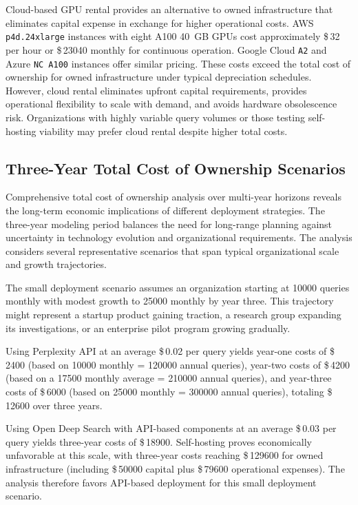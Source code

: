Cloud-based GPU rental provides an alternative to owned infrastructure that eliminates capital expense in exchange for higher operational costs. AWS \texttt{p4d.24xlarge} instances with eight A100 40~GB GPUs cost approximately \$\,\num{32} per hour or \$\,\num{23040} monthly for continuous operation. Google Cloud \texttt{A2} and Azure \texttt{NC~A100} instances offer similar pricing. These costs exceed the total cost of ownership for owned infrastructure under typical depreciation schedules. However, cloud rental eliminates upfront capital requirements, provides operational flexibility to scale with demand, and avoids hardware obsolescence risk. Organizations with highly variable query volumes or those testing self-hosting viability may prefer cloud rental despite higher total costs.

\subsection{Three-Year Total Cost of Ownership Scenarios}

Comprehensive total cost of ownership analysis over multi-year horizons reveals the long-term economic implications of different deployment strategies. The three-year modeling period balances the need for long-range planning against uncertainty in technology evolution and organizational requirements. The analysis considers several representative scenarios that span typical organizational scale and growth trajectories.

The small deployment scenario assumes an organization starting at \num{10000} queries monthly with modest growth to \num{25000} monthly by year three. This trajectory might represent a startup product gaining traction, a research group expanding its investigations, or an enterprise pilot program growing gradually. 

Using Perplexity API at an average \$\,\num{0.02} per query yields year-one costs of \$\,\num{2400} (based on \num{10000} monthly = \num{120000} annual queries), year-two costs of \$\,\num{4200} (based on a \num{17500} monthly average = \num{210000} annual queries), and year-three costs of \$\,\num{6000} (based on \num{25000} monthly = \num{300000} annual queries), totaling \$\,\num{12600} over three years. 

Using Open Deep Search with API-based components at an average \$\,\num{0.03} per query yields three-year costs of \$\,\num{18900}. Self-hosting proves economically unfavorable at this scale, with three-year costs reaching \$\,\num{129600} for owned infrastructure (including \$\,\num{50000} capital plus \$\,\num{79600} operational expenses). The analysis therefore favors API-based deployment for this small deployment scenario.


